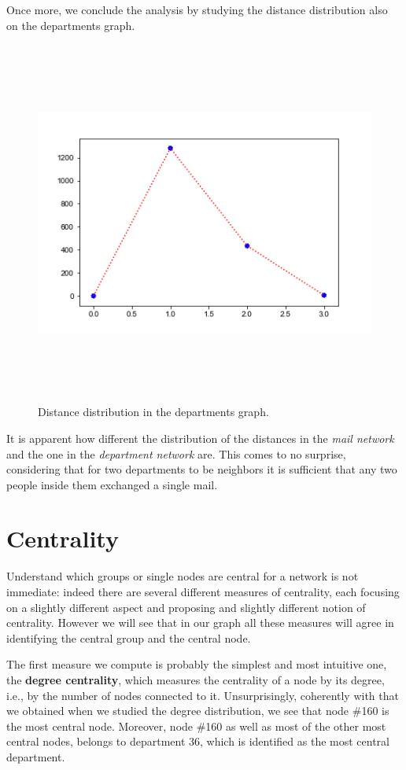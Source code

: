 \documentclass{report}
\theoremstyle{definition}
\theoremstyle{remark}
\begin{document}
Once more, we conclude the analysis by studying the distance distribution also on the departments graph.
\begin{figure} [H]
	\centering
	\centerline{\includegraphics[width = 13cm, height = 12cm, keepaspectratio]{DEP_distance_distribution.png}}
	\label{Dist_dep}
	\caption{Distance distribution in the departments graph.}
\end{figure}
It is apparent how different the distribution of the distances in the \textit{mail network} and the one in the \textit{department network} are. This comes to no surprise, considering that for two departments to be neighbors it is sufficient that any two people inside them exchanged a single mail.
\section*{Centrality}
Understand which groups or single nodes are central for a network is not immediate: indeed there are several different measures of centrality, each focusing on a slightly different aspect and proposing and slightly different notion of centrality. However we will see that in our graph all these measures will agree in identifying the central group and the central node.

The first measure we compute is probably the simplest and most intuitive one, the \textbf{degree centrality}, which measures the centrality of a node by its degree, i.e., by the number of nodes connected to it. Unsurprisingly, coherently with that we obtained when we studied the degree distribution, we see that node \#160 is the most central node. Moreover, node \#160 as well as most of the other most central nodes, belongs to department 36, which is identified as the most central department.
\end{document}
